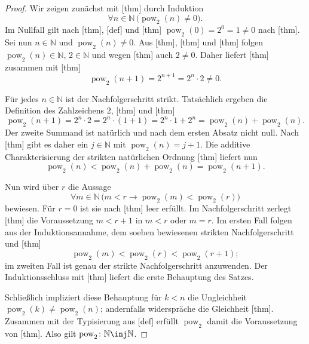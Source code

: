 \documentclass[main.tex]{subfiles}
\begin{document}
\begin{proof}
Wir zeigen zunächst mit [thm] durch Induktion
\[
  \forall n\in\mathbb N\,
  \bigl(\operatorname{pow}_2(n)\neq0\bigr).
\]
Im Nullfall gilt nach [thm],
[def] und
[thm]
\(\operatorname{pow}_2(0)=2^0=1\neq0\) nach
[thm].
Sei nun \(n\in\mathbb N\) und
\(\operatorname{pow}_2(n)\neq0\). Aus
[thm],
[thm] und
[thm] folgen
\(\operatorname{pow}_2(n)\in\mathbb N\), \(2\in\mathbb N\) und wegen
[thm] auch \(2\neq0\). Daher liefert
[thm]
zusammen mit [thm]
\[
  \operatorname{pow}_2(n+1)
  =2^{n+1}=2^n\cdot2\neq0.
\]

Für jedes \(n\in\mathbb N\) ist der Nachfolgerschritt strikt. Tatsächlich
ergeben die Definition des Zahlzeichens \(2\),
[thm] und
[thm]
\[
  \operatorname{pow}_2(n+1)
  =2^n\cdot2
  =2^n\cdot(1+1)
  =2^n\cdot1+2^n
  =\operatorname{pow}_2(n)+\operatorname{pow}_2(n).
\]
Der zweite Summand ist natürlich und nach dem ersten Absatz nicht null.
Nach [thm] gibt es daher ein
\(j\in\mathbb N\) mit
\(\operatorname{pow}_2(n)=j+1\). Die additive Charakterisierung der
strikten natürlichen Ordnung
[thm] liefert nun
\[
  \operatorname{pow}_2(n)
  <\operatorname{pow}_2(n)+\operatorname{pow}_2(n)
  =\operatorname{pow}_2(n+1).
\]

Nun wird über \(r\) die Aussage
\[
  \forall m\in\mathbb N\,
  \bigl(m<r\rightarrow
    \operatorname{pow}_2(m)<\operatorname{pow}_2(r)\bigr)
\]
bewiesen. Für \(r=0\) ist sie nach
[thm] leer erfüllt. Im
Nachfolgerschritt zerlegt
[thm] die Voraussetzung
\(m<r+1\) in \(m<r\) oder \(m=r\). Im ersten Fall folgen aus der
Induktionsannahme, dem soeben bewiesenen strikten Nachfolgerschritt und
[thm]
\[
  \operatorname{pow}_2(m)<\operatorname{pow}_2(r)
  <\operatorname{pow}_2(r+1);
\]
im zweiten Fall ist genau der strikte Nachfolgerschritt anzuwenden. Der
Induktionsschluss mit [thm]
liefert die erste Behauptung des Satzes.

Schließlich impliziert diese Behauptung für \(k<n\) die Ungleichheit
\(\operatorname{pow}_2(k)\neq\operatorname{pow}_2(n)\); andernfalls
widerspräche die Gleichheit
[thm]. Zusammen mit der
Typisierung aus [def] erfüllt
\(\operatorname{pow}_2\) damit die Voraussetzung von
[thm]. Also gilt
\(\operatorname{pow}_2\colon\mathbb N\inj\mathbb N\).
\end{proof}
\end{document}

